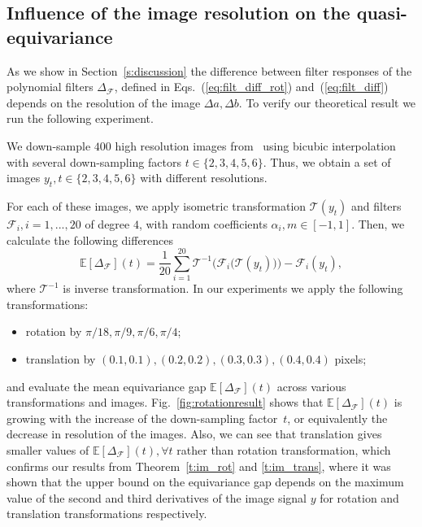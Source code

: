 \documentclass[10pt,journal,compsoc]{IEEEtran}
\newcommand{\mF}{\mathcal{F}}
\begin{document}
	\subsection{Influence of the image resolution on the quasi-equivariance}

	As we show in Section~\ref{s:discussion} the difference between filter responses of the polynomial filters $\Delta_\mathcal{F}$, defined in Eqs.~(\ref{eq:filt_diff_rot}) and~(\ref{eq:filt_diff}) depends on the resolution of the image $\Delta a, \Delta b$. To verify our theoretical result we run the following experiment.

	We down-sample $400$ high resolution images from~\cite{bb:Agustsson_2017_CVPR_Workshops} using bicubic interpolation with several down-sampling factors $t\in\{2,3,4,5,6\}$. Thus, we obtain a set of images $y_t, t\in\{2,3,4,5,6\}$ with different resolutions.

	For each of these images,  we apply isometric transformation $\mathcal{T}(y_t)$ and filters $\mF_i, i =1,...,20$ of degree $4$, with random coefficients $\alpha_i,m \in [-1, 1]$. Then, we calculate the following differences
		\begin{equation}
		\mathbb{E}[\Delta_{\mF}](t) = \frac{1}{20} \sum_{i=1}^{20} \mathcal{T}^{-1}\big(\mF_i\big(\mathcal{T}(y_t)\big)\big) - \mF_i(y_t),
		\label{eq:dist}
		\end{equation}
	where $\mathcal{T}^{-1}$ is inverse transformation. In our experiments we apply the following transformations:
	\begin{itemize}
	\item rotation by $\pi/18, \pi/9, \pi/6, \pi/4$;
	\item translation by $(0.1, 0.1),(0.2, 0.2),(0.3, 0.3),(0.4, 0.4)$ pixels;
	\end{itemize}
	and evaluate the mean equivariance gap $\mathbb{E}[\Delta_{\mF}](t)$ across various transformations and images. Fig.~\ref{fig:rotationresult} shows that $\mathbb{E}[\Delta_{\mF}](t)$ is growing with the increase of the  down-sampling factor~$t$, or equivalently the decrease in resolution of the images.  Also, we can see that translation gives smaller values of  $\mathbb{E}[\Delta_{\mF}](t), \forall t$ rather than rotation transformation, which confirms our results from Theorem~\ref{t:im_rot} and \ref{t:im_trans}, where it was shown that the upper bound on the equivariance gap depends on the maximum value of the second and third derivatives of the image signal $y$ for rotation and translation transformations respectively.
\end{document}
